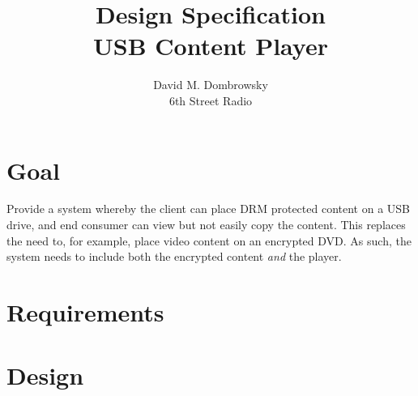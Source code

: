 \documentclass{article}
\title{Design Specification \\ USB Content Player}
\author{David M. Dombrowsky \\ 6th Street Radio}
\begin{document}
\maketitle

\section{Goal}

Provide a system whereby the client can place DRM protected content on
a USB drive, and end consumer can view but not easily copy the
content.  This replaces the need to, for example, place video content
on an encrypted DVD.  As such, the system needs to include both the 
encrypted content {\it and} the player.

\section{Requirements}



\section{Design}
\end{document}
